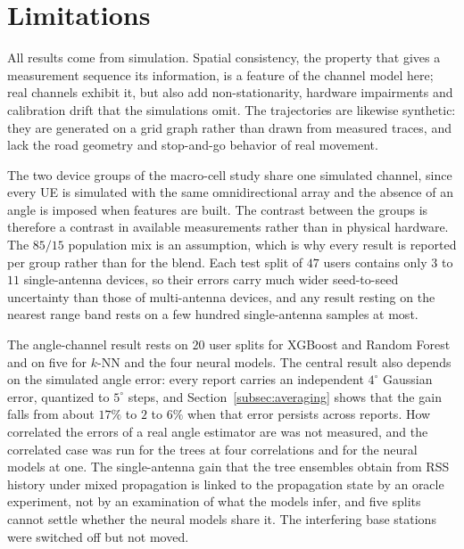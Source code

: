 \section{Limitations}
\label{sec:limitations}

All results come from simulation. Spatial consistency, the property that gives a measurement sequence its information, is a feature of the channel model here; real channels exhibit it, but also add non-stationarity, hardware impairments and calibration drift that the simulations omit. The trajectories are likewise synthetic: they are generated on a grid graph rather than drawn from measured traces, and lack the road geometry and stop-and-go behavior of real movement.

The two device groups of the macro-cell study share one simulated channel, since every UE is simulated with the same omnidirectional array and the absence of an angle is imposed when features are built. The contrast between the groups is therefore a contrast in available measurements rather than in physical hardware. The $85/15$ population mix is an assumption, which is why every result is reported per group rather than for the blend. Each test split of $47$ users contains only $3$ to $11$ single-antenna devices, so their errors carry much wider seed-to-seed uncertainty than those of multi-antenna devices, and any result resting on the nearest range band rests on a few hundred single-antenna samples at most.

The angle-channel result rests on $20$ user splits for XGBoost and Random Forest and on five for $k$-NN and the four neural models. The central result also depends on the simulated angle error: every report carries an independent $4^\circ$ Gaussian error, quantized to $5^\circ$ steps, and Section~\ref{subsec:averaging} shows that the gain falls from about $17\%$ to $2$ to $6\%$ when that error persists across reports. How correlated the errors of a real angle estimator are was not measured, and the correlated case was run for the trees at four correlations and for the neural models at one. The single-antenna gain that the tree ensembles obtain from RSS history under mixed propagation is linked to the propagation state by an oracle experiment, not by an examination of what the models infer, and five splits cannot settle whether the neural models share it. The interfering base stations were switched off but not moved.

